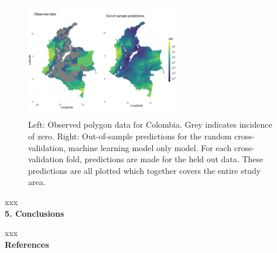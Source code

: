 \documentclass[11pt]{article}
\begin{document}
\begin{figure}
\centering
\includegraphics[trim={0 40mm 0 100mm}, width = 0.6\textwidth]{figs/col_obs_pred_map_ml.png} %
\caption{
  Left: Observed polygon data for Colombia. Grey indicates incidence of zero. Right: Out-of-sample predictions for the random cross-validation, machine learning model only model. For each cross-validation fold, predictions are made for the held out data. These predictions are all plotted which together covers the entire study area.
}
\label{randompredobspointfacet}
\end{figure}


xxx  \\

{\bf 5. Conclusions}


xxx\\

{\bf References}\\

 

\end{document}
